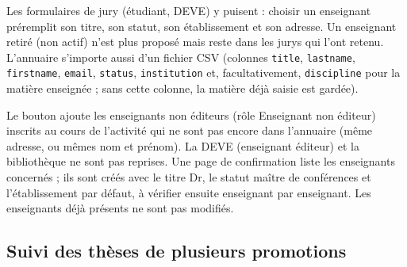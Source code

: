 \documentclass[11pt,a4paper]{article}
\begin{document}

Les formulaires de jury (étudiant, DEVE) y puisent : choisir un enseignant
préremplit son titre, son statut, son établissement et son adresse. Un
enseignant retiré (non actif) n'est plus proposé mais reste dans les jurys qui
l'ont retenu. L'annuaire s'importe aussi d'un fichier CSV (colonnes
\texttt{title}, \texttt{lastname}, \texttt{firstname}, \texttt{email},
\texttt{status}, \texttt{institution} et, facultativement,
\texttt{discipline} pour la matière enseignée ; sans cette colonne, la matière
déjà saisie est gardée).

Le bouton  ajoute les
enseignants non éditeurs (rôle \og Enseignant non éditeur\fg{}) inscrits au
cours de l'activité qui ne sont pas encore dans l'annuaire (même adresse, ou
mêmes nom et prénom). La DEVE (enseignant éditeur) et la
bibliothèque ne sont pas reprises. Une page de confirmation liste les
enseignants concernés ; ils sont créés avec le titre Dr, le statut maître de
conférences et l'établissement par défaut, à vérifier ensuite enseignant par
enseignant. Les enseignants déjà présents ne sont pas modifiés.

\subsection{Suivi des thèses de plusieurs promotions}\label{sec:suivi}
\end{document}
